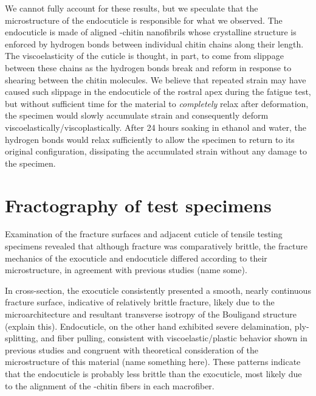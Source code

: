 \documentclass[twocolumn, linenumbers, superscriptaddress]{revtex4-1}
\begin{document}
		We cannot fully account for these results, but we speculate that the microstructure of the endocuticle is responsible for what we observed.
		The endocuticle is made of aligned \textalpha-chitin nanofibrils whose crystalline structure is enforced by hydrogen bonds between individual chitin chains along their length.
		The viscoelasticity of the cuticle is thought, in part, to come from slippage between these chains as the hydrogen bonds break and reform in response to shearing between the chitin molecules.
		We believe that repeated strain may have caused such slippage in the endocuticle of the rostral apex during the fatigue test, but without sufficient time for the material to \textit{completely} relax after deformation, the specimen would slowly accumulate strain and consequently deform viscoelastically/viscoplastically.
		After 24 hours soaking in ethanol and water, the hydrogen bonds would relax sufficiently to allow the specimen to return to its original configuration, dissipating the accumulated strain without any damage to the specimen.
			
	\section{Fractography of test specimens}
		Examination of the fracture surfaces and adjacent cuticle of tensile testing specimens revealed that although fracture was comparatively brittle, the fracture mechanics of the exocuticle and endocuticle differed according to their microstructure, in agreement with previous studies (name some).
			
		In cross-section, the exocuticle consistently presented a smooth, nearly continuous fracture surface, indicative of relatively brittle fracture, likely due to the microarchitecture and resultant transverse isotropy of the Bouligand structure (explain this).
		Endocuticle, on the other hand exhibited severe delamination, ply-splitting, and fiber pulling, consistent with viscoelastic/plastic behavior shown in previous studies and congruent with theoretical consideration of the microstructure of this material (name something here). 
		These patterns indicate that the endocuticle is probably less brittle than the exocuticle, most likely due to the alignment of the \textalpha-chitin fibers in each macrofiber.
		
\end{document}
